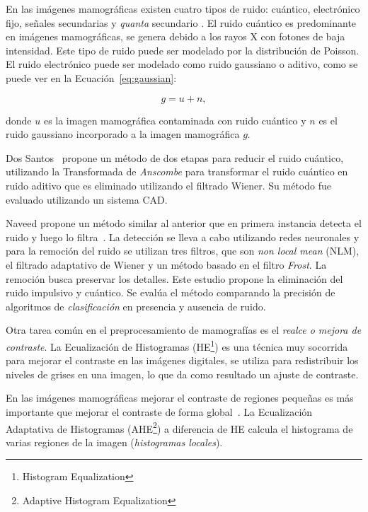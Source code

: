 En las imágenes mamográficas existen cuatro tipos de ruido: cuántico,
electrónico fijo, señales secundarias y \textit{quanta} secundario
\cite{hashimoto2008practical}. El ruido cuántico es predominante en imágenes
mamográficas, se genera debido a los rayos X con fotones de baja intensidad.
Este tipo de ruido puede ser modelado por la distribución de Poisson. El ruido
electrónico puede ser modelado como ruido gaussiano o aditivo, como se puede
ver en la Ecuación~\ref{eq:gaussian}:

\begin{equation}
\label{eq:gaussian}
            g = u + n,
\end{equation}

\noindent donde $u$ es la imagen mamográfica contaminada con ruido cuántico y
$n$ es el ruido gaussiano incorporado a la imagen mamográfica $g$.

Dos Santos~\cite{dos2009mammography} propone un método de dos etapas para
reducir el ruido cuántico, utilizando la Transformada de \textit{Anscombe} para
transformar el ruido cuántico en ruido aditivo que es eliminado utilizando el
filtrado Wiener. Su método fue evaluado utilizando un sistema CAD. 

Naveed propone un método similar al anterior que en primera instancia detecta
el ruido y luego lo filtra~\cite{naveed2012quantum}. La detección se lleva a
cabo utilizando redes neuronales y para la remoción del ruido se utilizan tres
filtros, que son \textit{non local mean} (NLM), el filtrado adaptativo de Wiener
y un método basado en el filtro \textit{Frost}. La remoción busca preservar los
detalles. Este estudio propone la eliminación del ruido impulsivo y cuántico.
Se evalúa el método comparando la precisión de algoritmos de
\textit{clasificación} en presencia y ausencia de ruido.

Otra tarea común en el preprocesamiento de mamografías es el \textit{realce o
mejora de contraste}. La Ecualización de Histogramas (HE\footnote{Histogram
Equalization}) es una técnica muy socorrida para mejorar el contraste en las
imágenes digitales, se utiliza para redistribuir los niveles de grises en una
imagen, lo que da como resultado un ajuste de contraste.

En las imágenes mamográficas mejorar el contraste de regiones pequeñas es más
importante que mejorar el contraste de forma global~\cite{mohan2013modified}.
La Ecualización Adaptativa de Histogramas (AHE\footnote{Adaptive Histogram
Equalization}) a diferencia de HE calcula el histograma de varias regiones de
la imagen (\textit{histogramas locales}).

